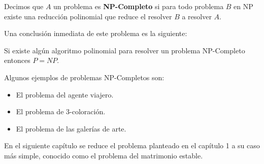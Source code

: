 \begin{dfn}
Decimos que $A$ un problema es \textbf{NP-Completo} si para todo problema $B$ en NP existe una reducción polinomial que reduce el resolver $B$ a resolver $A$.
\end{dfn}

Una conclusión inmediata de este problema es la siguiente: 

\begin{obs}
Si existe algún algoritmo polinomial para resolver un problema NP-Completo entonces $P=NP$.
\end{obs}

Algunos ejemplos de problemas NP-Completos son: 

\begin{eje}
\begin{itemize}
\item El problema del agente viajero. 
\item El problema de 3-coloración. 
\item El problema de las galerías de arte.
\end{itemize}
\fin
\end{eje}


En el siguiente capítulo se reduce el problema planteado en el capítulo 1 a su caso más simple, conocido como el problema del matrimonio estable.
